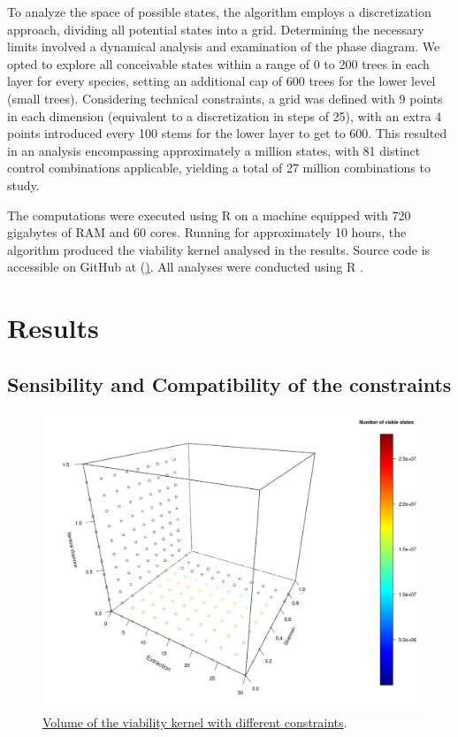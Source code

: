 \documentclass{article}
\begin{document}
To analyze the space of possible states, the algorithm employs a discretization approach, dividing all potential states into a grid. Determining the necessary limits involved a dynamical analysis and examination of the phase diagram. We opted to explore all conceivable states within a range of 0 to 200 trees in each layer for every species, setting an additional cap of 600 trees for the lower level (small trees). Considering technical constraints, a grid was defined with 9 points in each dimension (equivalent to a discretization in steps of 25), with an extra 4 points introduced every 100 stems for the lower layer to get to 600. This resulted in an analysis encompassing approximately a million states, with 81 distinct control combinations applicable, yielding a total of 27 million combinations to study.



The computations were executed using R on a machine equipped with 720 gigabytes of RAM and 60 cores. Running for approximately 10 hours, the algorithm produced the viability kernel analysed in the results. Source code is accessible on GitHub at (\href{https://github.com/clem9123/Forest_management_and_viability}). All analyses were conducted using R \autocite{Rsoftware}.

\section{Results}

\subsection{Sensibility and Compatibility of the constraints}

\begin{figure}[t]
    \centering
    \includegraphics[width=\textwidth]{Figure/Results/Sensi.png}
    \caption{\underline{Volume of the viability kernel with different constraints}.}
    \label{fig:sensi}
\end{figure}
\end{document}
